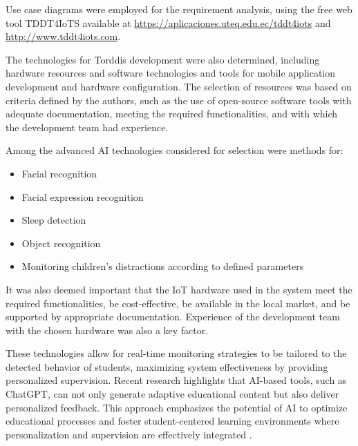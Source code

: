 				Use case diagrams were employed for the requirement analysis, using the free web tool TDDT4IoTS available at \href{https://aplicaciones.uteq.edu.ec/tddt4iots}{https://aplicaciones.uteq.edu.ec/tddt4iots} and \href{http://www.tddt4iots.com}{http://www.tddt4iots.com}.
				
				
                The technologies for Torddis development were also determined, including hardware resources and software technologies and tools for mobile application development and hardware configuration. The selection of resources was based on criteria defined by the authors, such as the use of open-source software tools with adequate documentation, meeting the required functionalities, and with which the development team had experience.
                
                Among the advanced AI technologies considered for selection were methods for:
                
                \begin{itemize}
                    \item Facial recognition
                    
                    \item Facial expression recognition
                    
                    \item Sleep detection
                    
                    \item Object recognition
                    
                    \item Monitoring children’s distractions according to defined parameters
                \end{itemize}
                
                It was also deemed important that the IoT hardware used in the system meet the required functionalities, be cost-effective, be available in the local market, and be supported by appropriate documentation. Experience of the development team with the chosen hardware was also a key factor.
                
                These technologies allow for real-time monitoring strategies to be tailored to the detected behavior of students, maximizing system effectiveness by providing personalized supervision. Recent research highlights that AI-based tools, such as ChatGPT, can not only generate adaptive educational content but also deliver personalized feedback. This approach emphasizes the potential of AI to optimize educational processes and foster student-centered learning environments where personalization and supervision are effectively integrated \citep{Wang2025Development,Li2024Systematic}.
                
